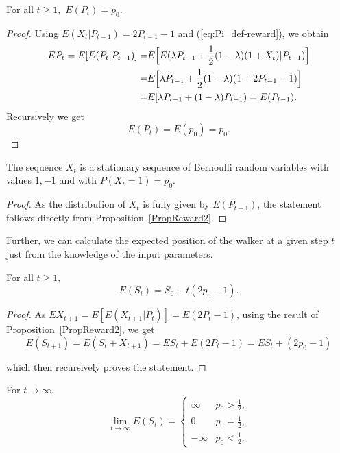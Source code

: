 \begin{proposition}
\label{PropReward2}For all $t\geq1,$ $E(P_{t})=p_{0}.$
\end{proposition}

\begin{proof}
Using $E(X_{t}|P_{t-1})=2P_{t-1}-1$ and (\ref{eq:Pi_def-reward}),
we obtain
$$
\aligned
EP_{t}=E[E(P_{t}|P_{t-1})]=&E\Big[E(\lambda P_{t-1}+\frac{1}{2}(1-\lambda)(1+X_{t})|P_{t-1})\Big]\\
=&E\Big[\lambda P_{t-1}+\frac{1}{2}(1-\lambda)(1+2P_{t-1}-1)\Big]\\
=&E[\lambda P_{t-1}+(1-\lambda)P_{t-1})=E(P_{t-1}).
\endaligned
$$
Recursively we get
\begin{equation}
E(P_{t})=E(p_{0})=p_{0}.\label{eq:EPt-reward-formula}
\end{equation}
\end{proof}

\begin{proposition}
The sequence $X_t$ is a stationary sequence of Bernoulli random
variables with values $1,-1$ and with $P(X_t=1)=p_0$.
\end{proposition}

\begin{proof}
As the distribution of $X_t$ is fully given by $E(P_{t-1})$, the
statement follows directly from Proposition~\ref{PropReward2}.
\end{proof}

Further, we can calculate the expected position of the walker at a given step $t$ just from the knowledge of the input parameters.

\begin{proposition}
For all $t\geq1,$
\[
E(S_{t})=S_{0}+t(2p_{0}-1).
\]
\end{proposition}


\begin{proof}
As $EX_{t+1}=E[E(X_{t+1}|P_t)]=E(2P_t -1)$, using the result of Proposition~\ref{PropReward2}, we get
\[
E(S_{t+1})= {E(S_{t}+X_{t+1}) = ES_{t}+E(2P_{t}-1)}=
ES_{t}+(2p_{0}-1)
\]

which then recursively proves the statement.
\end{proof}

\begin{corollary}
For $t\rightarrow\infty,$
\[
\lim_{t\to\infty}E(S_{t})=\begin{cases}
   \infty & p_{0}>\frac{1}{2},\\
   0 & p_{0}=\frac{1}{2},\\
   -\infty & p_{0}<\frac{1}{2}.
\end{cases}
\]
\end{corollary}

